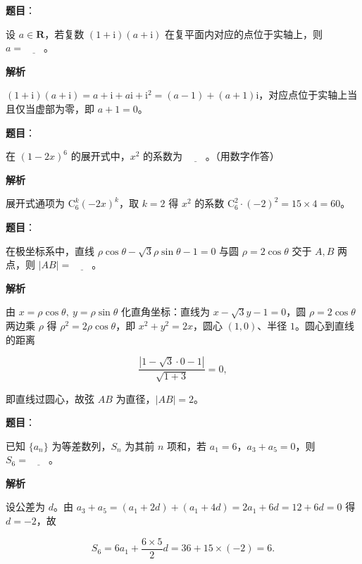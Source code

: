 \begin{answer}

\textbf{题目}：

设 \(a\in\mathbf{R}\)，若复数 \((1+\mathrm{i})(a+\mathrm{i})\) 在复平面内对应的点位于实轴上，则 \(a=\underline{\qquad}\)。

\textbf{解析}

\((1+\mathrm i)(a+\mathrm i)=a+\mathrm i+a\mathrm i+\mathrm i^2=(a-1)+(a+1)\mathrm i\)，对应点位于实轴上当且仅当虚部为零，即 \(a+1=0\)。


\end{answer}
\begin{answer}

\textbf{题目}：

在 \((1-2x)^{6}\) 的展开式中，\(x^{2}\) 的系数为 \(\underline{\qquad}\)。（用数字作答）

\textbf{解析}

展开式通项为 \(\mathrm C_6^{k}(-2x)^{k}\)，取 \(k=2\) 得 \(x^2\) 的系数 \(\mathrm C_6^{2}\cdot(-2)^2=15\times4=60\)。


\end{answer}
\begin{answer}

\textbf{题目}：

在极坐标系中，直线 \(\rho\cos\theta-\sqrt{3}\rho\sin\theta-1=0\) 与圆 \(\rho=2\cos\theta\) 交于 \(A,B\) 两点，则 \(|AB|=\underline{\qquad}\)。

\textbf{解析}

由 \(x=\rho\cos\theta,\ y=\rho\sin\theta\) 化直角坐标：直线为 \(x-\sqrt3y-1=0\)，圆 \(\rho=2\cos\theta\) 两边乘 \(\rho\) 得 \(\rho^2=2\rho\cos\theta\)，即 \(x^2+y^2=2x\)，圆心 \((1,0)\)、半径 \(1\)。圆心到直线的距离

\nopagebreak[4]
\[
\frac{|1-\sqrt3\cdot0-1|}{\sqrt{1+3}}=0,
\]

即直线过圆心，故弦 \(AB\) 为直径，\(|AB|=2\)。


\end{answer}
\begin{answer}

\textbf{题目}：

已知 \(\{a_{n}\}\) 为等差数列，\(S_{n}\) 为其前 \(n\) 项和，若 \(a_{1}=6\)，\(a_{3}+a_{5}=0\)，则 \(S_{6}=\underline{\qquad}\)。

\textbf{解析}

设公差为 \(d\)。由 \(a_3+a_5=(a_1+2d)+(a_1+4d)=2a_1+6d=12+6d=0\) 得 \(d=-2\)，故

\nopagebreak[4]
\[
S_6=6a_1+\frac{6\times5}{2}d=36+15\times(-2)=6.
\]


\end{answer}

